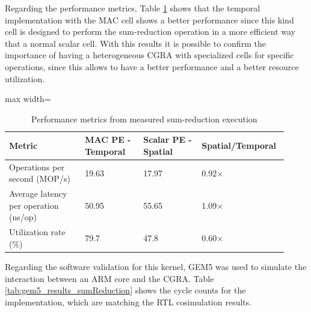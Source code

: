 \documentclass[conference]{IEEEtran}
\begin{document}
Regarding the performance metrics, Table \ref{tab:perf_metrics_sumReduction} shows that the temporal implementation with the MAC cell shows a better performance since this kind cell is designed to perform the sum-reduction operation in a more efficient way that a normal scalar cell. 
With this results it is possible to confirm the importance of having a heterogeneous CGRA with specialized cells for specific operations, since this allows to have a better performance and a better resource utilization.


\begin{table}[htbp]
\centering
\caption{Performance metrics from measured sum-reduction execution}
\label{tab:perf_metrics_sumReduction}
\scriptsize
\begin{adjustbox}{max width=\columnwidth}
\begin{tabular}{@{}p{0.26\linewidth}p{0.20\linewidth}p{0.20\linewidth}p{0.26\linewidth}@{}}
\toprule
\textbf{Metric} & \textbf{MAC PE - Temporal} & \textbf{Scalar PE - Spatial} & \textbf{Spatial/Temporal} \\
\midrule
Operations per second (MOP/s) & 19.63 & 17.97 & 0.92$\times$ \\
Average latency per operation (ns/op) & 50.95  & 55.65  & 1.09$\times$ \\
Utilization rate (\%) & 79.7 & 47.8 & 0.60$\times$ \\
\bottomrule
\end{tabular}
\end{adjustbox}
\end{table}

Regarding the software validation for this kernel, GEM5 was used to simulate the interaction between an ARM core and the CGRA. 
Table \ref{tab:gem5_results_sumReduction} shows the cycle counts for the implementation, which are matching the RTL cosimulation results. 

\end{document}
